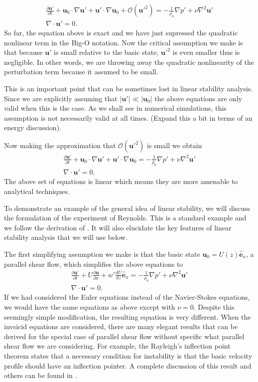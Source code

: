 \begin{align}
\frac{\partial \bm{u}'}{\partial t} + \bm{u}_{0}\cdot\nabla \bm{u}' + \bm{u}'\cdot\nabla\bm{u}_{0} + \mathcal{O}(\bm{u}'^{2})  = -\frac{1}{\rho_{0}}\nabla p' + \nu\nabla^{2}\bm{u}'\\
 \nabla \cdot \bm{u}'=0.
\end{align}
So far, the equation above is exact and we have just supressed the quadratic nonlinear term in the Big-O notation. Now the critical assumption we make is that because $\bm{u}'$ is small relative to the basic state, $\bm{u}'^{2}$ is even smaller thus is negligible. In other words, we are throwing away the quadratic nonlinearity of the perturbation term because it assumed to be small. 

This is an important point that can be sometimes lost in linear stability analysis. Since we are explicitly assuming that $|\bm{u}'|\ll |\bm{u}_{0}|$ the above equations are only valid when this is the case. As we shall see in numerical simulations, this assumption is not necessarily valid at all times. (Expand this a bit in terms of an energy discussion).

Now making the approximation that $\mathcal{O}(\bm{u}'^{2})$ is small we obtain
\begin{align}
\frac{\partial \bm{u}'}{\partial t} + \bm{u}_{0}\cdot\nabla \bm{u}' + \bm{u}'\cdot\nabla\bm{u}_{0} =  -\frac{1}{\rho_{0}}\nabla p' + \nu\nabla^{2}\bm{u}'\\
 \nabla \cdot \bm{u}'=0.
\end{align}
The above set of equations is linear which means they are more amenable to analytical techniques. 

To demonstrate an example of the general idea of linear stability, we will discuss the formulation of the experiment of Reynolds. This is a standard example and we follow the derivation of \cite{drazinreid}. It will also elucidate the key features of linear stability analysis that we will use below. 

The first simplifying assumption we make is that the basic state $\bm{u}_{0}=U(z)\hat{\bm{e}}_{x}$, a parallel shear flow, which simplifies the above equations to
\begin{align}
\frac{\partial \bm{u}'}{\partial t} + U\frac{\partial \bm{u}}{\partial x} + w'\frac{dU}{dz}\hat{\bm{e}}_{x}= -\frac{1}{\rho_{0}}\nabla p' + \nu\nabla^{2} \bm{u}'\\
\nabla \cdot\bm{u}'=0.
\end{align}
If we had considered the Euler equations instead of the Navier-Stokes equations, we would have the same equations as above except with $\nu=0$. Despite this seemingly simple modification, the resulting equation is very different. When the invsicid equations are considered, there are many elegant results that can be derived for the special case of parallel shear flow without specific what parallel shear flow we are considering. For example, the Rayleigh's inflection point theorem states that a necessary condition for instability is that the basic velocity profile should have an inflection pointer\cite{drazinreid}. A complete discussion of this result and others can be found in \cite{drazinreid,kundu}.

